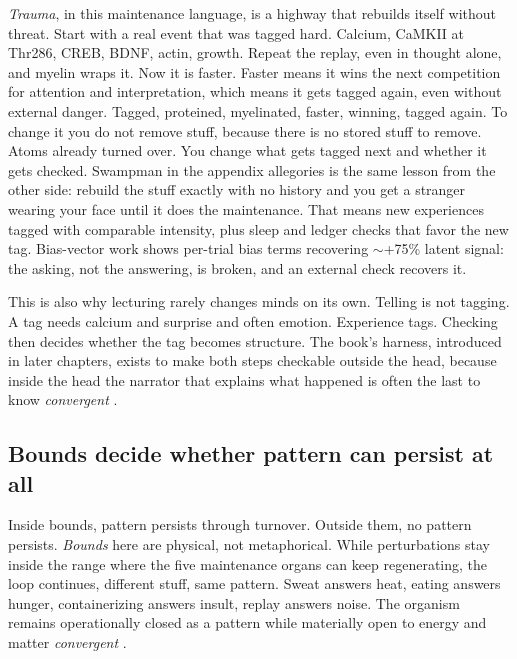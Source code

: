 \textit{Trauma}, in this maintenance language, is a highway that rebuilds itself without threat. Start with a real event that was tagged hard. Calcium, CaMKII at Thr286, CREB, BDNF, actin, growth. Repeat the replay, even in thought alone, and myelin wraps it. Now it is faster. Faster means it wins the next competition for attention and interpretation, which means it gets tagged again, even without external danger. Tagged, proteined, myelinated, faster, winning, tagged again. To change it you do not remove stuff, because there is no stored stuff to remove. Atoms already turned over. You change what gets tagged next and whether it gets checked. Swampman in the appendix allegories is the same lesson from the other side: rebuild the stuff exactly with no history and you get a stranger wearing your face until it does the maintenance. That means new experiences tagged with comparable intensity, plus sleep and ledger checks that favor the new tag. Bias-vector work \citep{macar2026} shows per-trial bias terms recovering $\sim$+75\% latent signal: the asking, not the answering, is broken, and an external check recovers it.

This is also why lecturing rarely changes minds on its own. Telling is not tagging. A tag needs calcium and surprise and often emotion. Experience tags. Checking then decides whether the tag becomes structure. The book's harness, introduced in later chapters, exists to make both steps checkable outside the head, because inside the head the narrator that explains what happened is often the last to know \textit{convergent} \citep{baars1988}.

\subsection*{Bounds decide whether pattern can persist at all}

Inside bounds, pattern persists through turnover. Outside them, no pattern persists. \textit{Bounds} here are physical, not metaphorical. While perturbations stay inside the range where the five maintenance organs can keep regenerating, the loop continues, different stuff, same pattern. Sweat answers heat, eating answers hunger, containerizing answers insult, replay answers noise. The organism remains operationally closed as a pattern while materially open to energy and matter \textit{convergent} \citep{maturana1980}.

